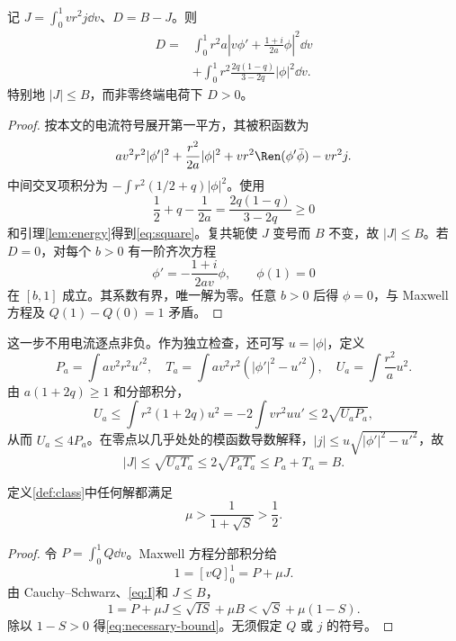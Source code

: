 \begin{lemma}[带权电流的精确平方分解]\label{lem:square}
记 $J=\int_0^1vr^2j\dd v$、$D=B-J$。则
\begin{equation}\label{eq:square}
\begin{aligned}
D={}&\int_0^1r^2a\left|v\phi'+\frac{1+i}{2a}\phi\right|^2\dd v\\
&+\int_0^1r^2\frac{2q(1-q)}{3-2q}|\phi|^2\dd v.
\end{aligned}
\end{equation}
特别地 $|J|\le B$，而非零终端电荷下 $D>0$。
\end{lemma}
\begin{proof}
按本文的电流符号展开第一平方，其被积函数为
\[
av^2r^2|\phi'|^2+\frac{r^2}{2a}|\phi|^2
+vr^2\Ren(\phi'\bar\phi)-vr^2j.
\]
中间交叉项积分为 $-\int r^2(1/2+q)|\phi|^2$。使用
\[
\frac12+q-\frac1{2a}=\frac{2q(1-q)}{3-2q}\ge0
\]
和引理\ref{lem:energy}得到\eqref{eq:square}。复共轭使 $J$ 变号而 $B$ 不变，故 $|J|\le B$。若 $D=0$，对每个 $b>0$ 有一阶齐次方程
\[
\phi'=-\frac{1+i}{2av}\phi,\qquad \phi(1)=0
\]
在 $[b,1]$ 成立。其系数有界，唯一解为零。任意 $b>0$ 后得 $\phi=0$，与 Maxwell 方程及 $Q(1)-Q(0)=1$ 矛盾。
\end{proof}

这一步不用电流逐点非负。作为独立检查，还可写 $u=|\phi|$，定义
\[
P_a=\int av^2r^2u'^2,\quad
T_a=\int av^2r^2(|\phi'|^2-u'^2),\quad
U_a=\int\frac{r^2}{a}u^2.
\]
由 $a(1+2q)\ge1$ 和分部积分，
\[
U_a\le\int r^2(1+2q)u^2=-2\int vr^2uu'
\le2\sqrt{U_aP_a},
\]
从而 $U_a\le4P_a$。在零点以几乎处处的模函数导数解释，$|j|\le u\sqrt{|\phi'|^2-u'^2}$，故
\[
|J|\le\sqrt{U_aT_a}\le2\sqrt{P_aT_a}\le P_a+T_a=B.
\]

\begin{theorem}[实际视界上的严格必要条件]\label{thm:necessary}
定义\ref{def:class}中任何解都满足
\begin{equation}\label{eq:necessary-bound}
\mu>\frac1{1+\sqrt S}>\frac12.
\end{equation}
\end{theorem}
\begin{proof}
令 $P=\int_0^1Q\dd v$。Maxwell 方程分部积分给
\[
1=[vQ]_0^1=P+\mu J.
\]
由 Cauchy--Schwarz、\eqref{eq:I}和 $J\le B$，
\[
1=P+\mu J\le\sqrt{IS}+\mu B<\sqrt S+\mu(1-S).
\]
除以 $1-S>0$ 得\eqref{eq:necessary-bound}。无须假定 $Q$ 或 $j$ 的符号。
\end{proof}

